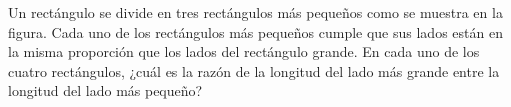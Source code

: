 Un rectángulo se divide en tres rectángulos más pequeños como se muestra en la figura. Cada uno de los rectángulos más pequeños cumple que sus lados están en la misma proporción que los lados del rectángulo grande. En cada uno de los cuatro rectángulos, ¿cuál es la razón de la longitud del lado más grande entre la longitud del lado más pequeño?